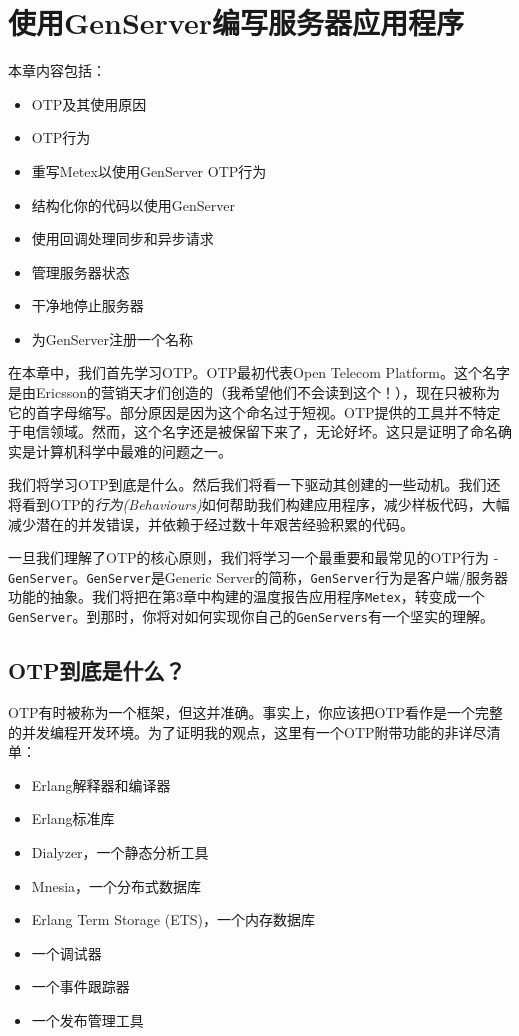\chapter{使用GenServer编写服务器应用程序}\label{chapt:genserver}

本章内容包括：

\begin{itemize}

\item  OTP及其使用原因
\item  OTP行为
\item  重写Metex以使用GenServer OTP行为
\item  结构化你的代码以使用GenServer
\item  使用回调处理同步和异步请求
\item  管理服务器状态
\item  干净地停止服务器
\item  为GenServer注册一个名称
\end{itemize}

在本章中，我们首先学习OTP。OTP最初代表Open Telecom Platform。这个名字是由Ericsson的营销天才们创造的（我希望他们不会读到这个！），现在只被称为它的首字母缩写。部分原因是因为这个命名过于短视。OTP提供的工具并不特定于电信领域。然而，这个名字还是被保留下来了，无论好坏。这只是证明了命名确实是计算机科学中最难的问题之一。

我们将学习OTP到底是什么。然后我们将看一下驱动其创建的一些动机。我们还将看到OTP的\emph{行为(Behaviours)}如何帮助我们构建应用程序，减少样板代码，大幅减少潜在的并发错误，并依赖于经过数十年艰苦经验积累的代码。

一旦我们理解了OTP的核心原则，我们将学习一个最重要和最常见的OTP行为 - \texttt{GenServer}。\texttt{GenServer}是Generic Server的简称，\texttt{GenServer}行为是客户端/服务器功能的抽象。我们将把在第3章中构建的温度报告应用程序\texttt{Metex}，转变成一个\texttt{GenServer}。到那时，你将对如何实现你自己的\texttt{GenServers}有一个坚实的理解。

 \section{OTP到底是什么？}

OTP有时被称为一个框架，但这并准确。事实上，你应该把OTP看作是一个完整的并发编程开发环境。为了证明我的观点，这里有一个OTP附带功能的非详尽清单：

\begin{itemize}

\item  Erlang解释器和编译器
\item  Erlang标准库
\item  Dialyzer，一个静态分析工具
\item  Mnesia，一个分布式数据库
\item  Erlang Term Storage (ETS)，一个内存数据库
\item  一个调试器
\item  一个事件跟踪器
\item  一个发布管理工具
\end{itemize}


